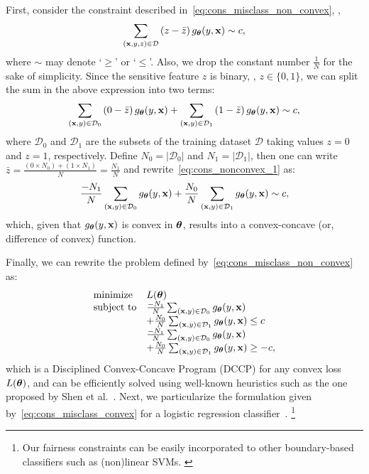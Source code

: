 \documentclass[letterpaper]{sig-alternate-2013}
\begin{document}
First, consider the constraint described in~\eqref{eq:cons_misclass_non_convex}, \ie,
\begin{align} \label{eq:cons_nonconvex}
\sum_{ (\mathbf{x},y,z) \in \mathcal{D}} \left(z - \bar{z}\right)  g_{\boldsymbol{\theta}}(y, \mathbf{x})  \sim c,
\end{align}
where $\sim$ may denote `$\geq$' or `$\leq$'. Also, we drop the constant number $\frac{1}{N}$ for the sake of simplicity.
Since the sensitive feature $z$ is binary, \ie, $z\in \{0,1\}$, we can split the sum in the above expression into two terms:
\begin{align} \label{eq:cons_nonconvex_1}
\sum_{ (\mathbf{x},y) \in \mathcal{D}_0 } \left(0 - \bar{z}\right)  g_{\boldsymbol{\theta}}(y, \mathbf{x}) + \sum_{ (\mathbf{x},y) \in \mathcal{D}_1 } \left(1 - \bar{z}\right)  g_{\boldsymbol{\theta}}(y, \mathbf{x})  \sim c,
\end{align}
where $\mathcal{D}_0$ and $\mathcal{D}_1$ are the subsets of the training dataset $\mathcal{D}$ taking values $z=0$ and $z=1$, respectively.
Define $N_0 = |\mathcal{D}_0|$ and $N_1 = |\mathcal{D}_1|$, then one can write $\bar{z} = \frac{(0 \times N_0) + (1 \times N_1)}{N} = \frac{N_1}{N}$ and rewrite~\eqref{eq:cons_nonconvex_1} as:
\begin{align} \label{eq:cons_nonconvex_2}
\frac{-N_1}{N} \sum_{ (\mathbf{x},y) \in \mathcal{D}_0 }  g_{\boldsymbol{\theta}}(y, \mathbf{x}) + \frac{N_0}{N} \sum_{ (\mathbf{x},y) \in \mathcal{D}_1 }  g_{\boldsymbol{\theta}}(y, \mathbf{x})  \sim c,
\end{align}
which, given that  $g_{ \boldsymbol{\theta}}(y, \mathbf{x})$ is convex in $\boldsymbol{\theta}$, results into a convex-concave (or, difference of convex) function.

Finally, we can rewrite the problem defined by~\eqref{eq:cons_misclass_non_convex} as:
\begin{equation}\label{eq:cons_misclass_convex}
	\begin{array}{ll}
		\mbox{minimize} & L(\boldsymbol{\theta}) \\
		\mbox{subject to}
			& \frac{-N_1}{N} \sum_{ (\mathbf{x},y) \in \mathcal{D}_0 }  g_{\boldsymbol{\theta}}(y, \mathbf{x}) \\ & + \frac{N_0}{N} \sum_{ (\mathbf{x},y) \in \mathcal{D}_1 }  g_{\boldsymbol{\theta}}(y, \mathbf{x})  \leq c \\
			& \frac{-N_1}{N} \sum_{ (\mathbf{x},y) \in \mathcal{D}_0 }  g_{\boldsymbol{\theta}}(y, \mathbf{x}) \\ & + \frac{N_0}{N} \sum_{ (\mathbf{x},y) \in \mathcal{D}_1 }  g_{\boldsymbol{\theta}}(y, \mathbf{x})  \geq -c,
	\end{array}
\end{equation}
which is a Disciplined Convex-Concave Program (DCCP) for any convex loss $L(\boldsymbol{\theta})$, and can be efficiently solved using well-known
heuristics such as the one proposed by Shen et al.~\cite{boyd_concave_convex}.
Next, we particularize the formulation given by~\eqref{eq:cons_misclass_convex} for a logistic regression
classifier~\cite{bishop2006pattern}.
\footnote{
\scriptsize{
Our fairness constraints can be easily incorporated to other boundary-based classifiers such as (non)linear SVMs.
}
}
\end{document}
